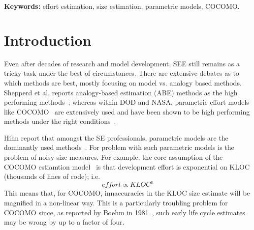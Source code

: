 \documentclass[final,twocolumn,5p]{elsarticle}
\begin{document}

 
\vspace{1mm}
\noindent
{\bf Keywords:} effort estimation, size estimation, parametric models, COCOMO.
{} %

\section{Introduction}


Even after decades of research and model
development, SEE still remains as a tricky task
under the best of circumstances.  There are
extensive debates as to which methods are best,
mostly focusing on model vs. analogy based methods.
Shepperd et al. reports analogy-based estimation
(ABE) methods as the high performing
methods~\cite{Shepperd1997}; whereas within DOD and
NASA, parametric effort models like
COCOMO~\cite{Boehm1981} are extensively used and
have been shown to be high performing methods under
the right conditions~\cite{Lum2002}.

Hihn report that amongst the SE professionals,
parametric models are the dominantly used
methods~\cite{Hihn1991}.
For problem with such parametric models is the  problem of noisy size measures.
For example, 
the core assumption of the COCOMO  estiamtion model~\cite{boehm81,boehm00b}
is that development effort
is exponential on KLOC (thousands of lines of code); i.e.
\[
\mathit{effort} \propto \mathit{KLOC}^n
\]
This means that, for COCOMO,  innaccuracies in the 
KLOC size estimate will be magnified in a non-linear way. This is a particularly
troubling problem for COCOMO since, as reported by Boehm in 1981~\cite{boehm81},
such early life cycle estimates may be wrong by up to a factor of four.
\end{document}
